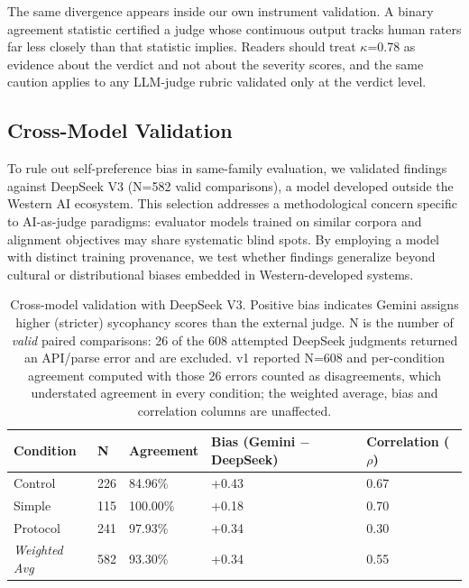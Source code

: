 \documentclass[sigconf,screen]{acmart}
\begin{document}
The same divergence appears inside our own instrument validation. A binary agreement statistic certified a judge whose continuous output tracks human raters far less closely than that statistic implies. Readers should treat $\kappa$=0.78 as evidence about the verdict and not about the severity scores, and the same caution applies to any LLM-judge rubric validated only at the verdict level.

\subsection{Cross-Model Validation} \label{sec:crossmodel}

To rule out self-preference bias in same-family evaluation, we validated findings against DeepSeek V3 (N=582 valid comparisons), a model developed outside the Western AI ecosystem. This selection addresses a methodological concern specific to AI-as-judge paradigms: evaluator models trained on similar corpora and alignment objectives may share systematic blind spots. By employing a model with distinct training provenance, we test whether findings generalize beyond cultural or distributional biases embedded in Western-developed systems.

\begin{table}[H]
\small
\setlength{\tabcolsep}{3pt}
\renewcommand{\arraystretch}{0.9}
\begin{tabularx}{\linewidth}{X l X X X}
\toprule
Condition & N & Agreement & Bias (Gemini $-$ DeepSeek) & Correlation ($\rho$) \\
\midrule
Control & 226 & 84.96\% & +0.43 & 0.67 \\
Simple & 115 & 100.00\% & +0.18 & 0.70 \\
Protocol & 241 & 97.93\% & +0.34 & 0.30 \\
\midrule
\textit{Weighted Avg} & 582 & 93.30\% & +0.34 & 0.55 \\
\bottomrule
\end{tabularx}
\caption{Cross-model validation with DeepSeek V3. Positive bias indicates Gemini assigns higher (stricter) sycophancy scores than the external judge. N is the number of \textit{valid} paired comparisons: 26 of the 608 attempted DeepSeek judgments returned an API/parse error and are excluded. v1 reported N=608 and per-condition agreement computed with those 26 errors counted as disagreements, which understated agreement in every condition; the weighted average, bias and correlation columns are unaffected.}
\label{tab:cross-validation}
\end{table}
\end{document}
